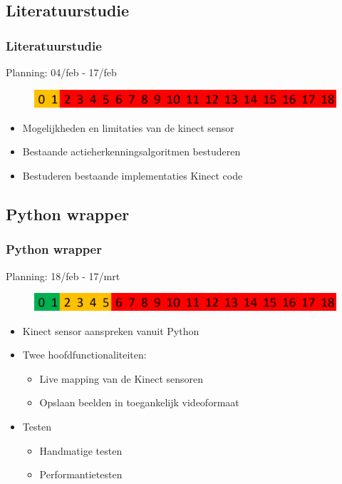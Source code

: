 \documentclass[]{beamer}
\begin{document}
	\subsection{Literatuurstudie}
	\begin{frame}
	\frametitle{Literatuurstudie}
		Planning: 04/feb - 17/feb
		\begin{figure}
		\includegraphics[width=\textwidth]{literatuur}
		\end{figure}
		\begin{itemize}
			\item<1- > Mogelijkheden en limitaties van de kinect sensor
			\item<1- > Bestaande actieherkenningsalgoritmen bestuderen
			\item<1- > Bestuderen bestaande implementaties Kinect code
		\end{itemize}
	\end{frame}

	\subsection{Python wrapper}
	\begin{frame}
	\frametitle{Python wrapper}
		Planning: 18/feb - 17/mrt
		\begin{figure}
		\includegraphics[width=\textwidth]{wrapper}
		\end{figure}
		\begin{itemize}
			\item<1- > Kinect sensor aanspreken vanuit Python
			\item<1- > Twee hoofdfunctionaliteiten:
			\begin{itemize}
				\item<1- > Live mapping van de Kinect sensoren
				\item<1- > Opslaan beelden in toegankelijk videoformaat
			\end{itemize}
			\item<1- > Testen
			\begin{itemize}
				\item Handmatige testen
				\item Performantietesten 
			\end{itemize}
		\end{itemize}
	\end{frame}
\end{document}
